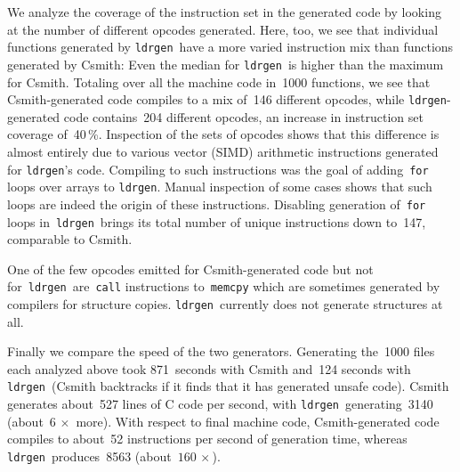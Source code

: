 \documentclass[a4paper]{easychair}
\newcommand\ldrgen{\texttt{ldrgen}}
\begin{document}
We analyze the coverage of the instruction set in the generated
code by looking at the number of different opcodes generated. Here, too, we
see that individual functions generated by \ldrgen\ have a more varied
instruction mix than functions generated by Csmith: Even the median for
\ldrgen\ is higher than the maximum for Csmith. Totaling over all the
machine code in~1000 functions, we see that Csmith-generated code compiles
to a mix of~146 different opcodes, while \ldrgen-generated code contains~204
different opcodes, an increase in instruction set coverage of~40\,\%.
Inspection of the sets of opcodes shows that this difference is almost
entirely due to various vector (SIMD) arithmetic instructions generated for
\ldrgen's code. Compiling to such instructions was the goal of
adding~\verb|for| loops over arrays to \ldrgen.  Manual inspection of some
cases shows that such loops are indeed the origin of these instructions.
Disabling generation of~\verb|for| loops in~\ldrgen\ brings its total number
of unique instructions down to~147, comparable to Csmith.

One of the few opcodes emitted for Csmith-generated code but not
for~\ldrgen\ are~\verb|call| instructions to~\verb|memcpy| which are
sometimes generated by compilers for structure copies. \ldrgen\ currently
does not generate structures at all.

Finally we compare the speed of the two generators. Generating the~1000
files each analyzed above took 871~seconds with Csmith and~124 seconds with
\ldrgen\ (Csmith backtracks if it finds that it has generated unsafe code).
Csmith generates about~527 lines of C code per second, with \ldrgen\
generating~3140 (about~\(6\,\times\) more). With respect to final machine
code, Csmith-generated code compiles to about~52 instructions per second of
generation time, whereas \ldrgen\ produces~8563 (about~\(160\,\times\)).



\end{document}
